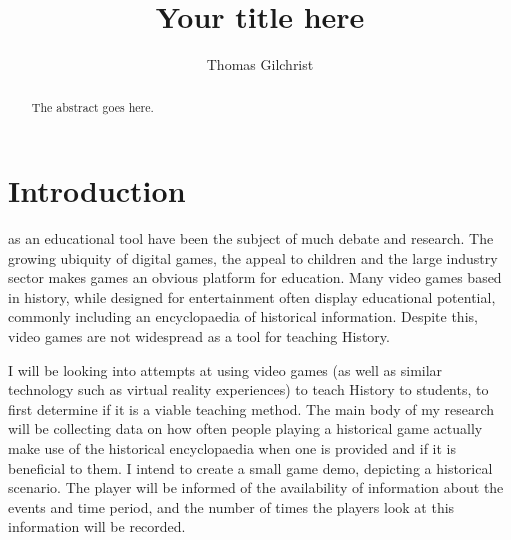 \documentclass[journal]{IEEEtran}
\begin{document}
%
\title{Your title here}
%
%
\author{Thomas Gilchrist}


\maketitle

\begin{abstract}
The abstract goes here.
\end{abstract}

\section{Introduction}

 as an educational tool have been the subject of much debate and research. The growing ubiquity of digital games, the appeal to children and the large industry sector makes games an obvious platform for education. Many video games based in history, while designed for entertainment often display educational potential, commonly including an encyclopaedia of historical information. Despite this, video games are not widespread as a tool for teaching History.

I will be looking into attempts at using video games (as well as similar technology such as virtual reality experiences) to teach History to students, to first determine if it is a viable teaching method. The main body of my research will be collecting data on how often people playing a historical game actually make use of the historical encyclopaedia when one is provided and if it is beneficial to them. I intend to create a small game demo, depicting a historical scenario. The player will be informed of the availability of information about the events and time period, and the number of times the players look at this information will be recorded.
\end{document}
